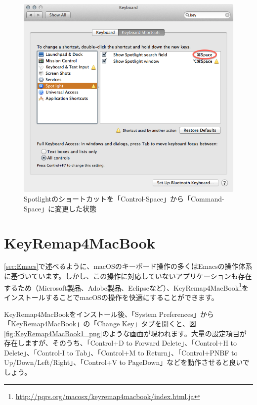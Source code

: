 \begin{figure}
  \centering
  \includegraphics[scale=0.35]{fig/Keyboard3.png}
  \caption{Spotlightのショートカットを「Control-Space」から「Command-Space」に変更した状態}
  \label{fig:Keyboard3_png}
\end{figure}

\section{KeyRemap4MacBook}
\label{sec:KeyRemap4MacBook}

\ref{sec:Emacs}で述べるように、macOSのキーボード操作の多くはEmacsの操作体系に基づいています。しかし、この操作に対応していないアプリケーションも存在するため（Microsoft製品、Adobe製品、Eclipseなど）、KeyRemap4MacBook\footnote{\url{http://pqrs.org/macosx/keyremap4macbook/index.html.ja}}をインストールすることでmacOSの操作を快適にすることができます。

KeyRemap4MacBookをインストール後、「System Preferences」から「KeyRemap4MacBook」の「Change Key」タブを開くと、図\ref{fig:KeyRemap4MacBook1_png}のような画面が現われます。大量の設定項目が存在しますが、そのうち、「Control+D to Forward Delete」、「Control+H to Delete」、「Control-I to Tab」、「Control+M to Return」、「Control+PNBF to Up/Down/Left/Right」、「Control+V to PageDown」などを動作させると良いでしょう。

